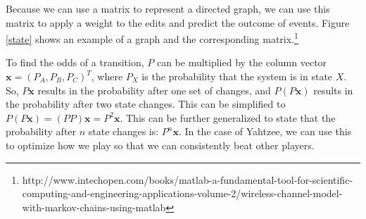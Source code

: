 Because we can use a matrix to represent a directed graph, we can use this matrix
to apply a weight to the edits and predict the outcome of events. Figure \ref{state}
shows an example of a graph and the corresponding matrix.\footnote{http://www.intechopen.com/books/matlab-a-fundamental-tool-for-scientific-computing-and-engineering-applications-volume-2/wireless-channel-model-with-markov-chains-using-matlab}

To find the odds of a transition, $P$ can be multiplied by the column vector
$\mathbf{x}=({P_A, P_B, P_C})^T$, where $P_X$ is the probability that the system
is in state $X$. So, $P\mathbf{x}$ results in the probability after one set
of changes, and $P(P\mathbf{x})$ results in the probability after two state
changes. This can be simplified to $P(P\mathbf{x}) = (PP)\mathbf{x} = P^2\mathbf{x}$.
This can be further generalized to state that the probability after $n$ state
changes is: $P^n\mathbf{x}$. In the case of Yahtzee, we can use this to optimize
how we play so that we can consistently beat other players.
